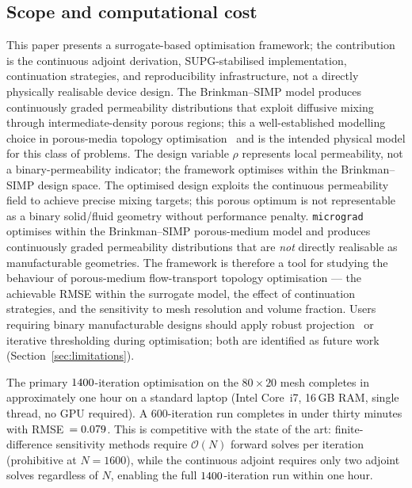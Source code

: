 \subsection{Scope and computational cost}
This paper presents a surrogate-based optimisation framework;
the contribution is the continuous adjoint derivation, SUPG-stabilised
implementation, continuation strategies, and reproducibility infrastructure,
not a directly physically realisable device design.
The Brinkman--SIMP model produces continuously graded permeability
distributions that exploit diffusive mixing through intermediate-density
porous regions; this a well-established modelling choice in
porous-media topology optimisation~\cite{borrvall2003,lazarov2016}
and is the intended physical model for this class of problems.
The design variable $\rho$ represents local permeability, not a
binary-permeability indicator; the framework optimises within the
Brinkman--SIMP design space.
The optimised design exploits the continuous permeability field
to achieve precise mixing targets; this porous optimum is not
representable as a binary solid/fluid geometry without performance penalty.
\texttt{micrograd} optimises within the Brinkman--SIMP
porous-medium model and produces continuously graded permeability
distributions that are \emph{not} directly realisable as
manufacturable geometries.
The framework is therefore a tool for studying the behaviour of
porous-medium flow-transport topology optimisation --- the
achievable RMSE within the surrogate model, the effect of
continuation strategies, and the sensitivity to mesh resolution
and volume fraction.
Users requiring binary manufacturable designs should apply
robust projection~\cite{wang2011} or iterative thresholding
during optimisation; both are identified as future work
(Section~\ref{sec:limitations}).

The primary $1400$-iteration optimisation on the $80\times20$ mesh
completes in approximately one hour on a standard laptop
(Intel Core~i7, 16\,GB RAM, single thread, no GPU required).
A 600-iteration run completes in under thirty minutes with
RMSE~$=0.079$.
This is competitive with the state of the art: finite-difference
sensitivity methods require $\mathcal{O}(N)$ forward solves per
iteration (prohibitive at $N=1600$), while the continuous adjoint
requires only two adjoint solves regardless of $N$,
enabling the full $1400$-iteration run within one hour.

